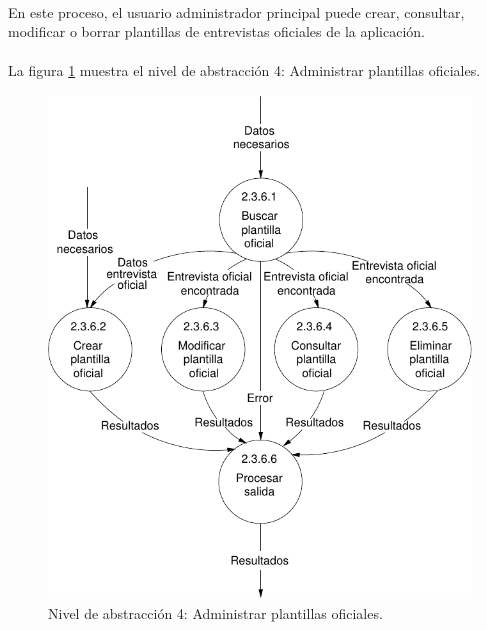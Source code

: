 \paragraph{}En este proceso, el usuario administrador principal puede crear,
consultar, modificar o borrar plantillas de entrevistas oficiales de la
aplicación.

\paragraph{}La figura \ref{diagramaNivel4-AdministrarPlantillasOficiales}
muestra el nivel de abstracción 4: Administrar plantillas oficiales.

  \begin{figure}[!ht]
    \begin{center}
      \includegraphics[]{08.Analisis_Funcional/8.2.DFDs/Niveles/Nivel4/AdministradorPrincipal/AdministrarPlantillasOficiales/Diagramas/nivel4-AdministrarPlantillasOficiales.pdf}
      \caption{Nivel de abstracción 4: Administrar plantillas oficiales.}
      \label{diagramaNivel4-AdministrarPlantillasOficiales}
    \end{center}
  \end{figure}
